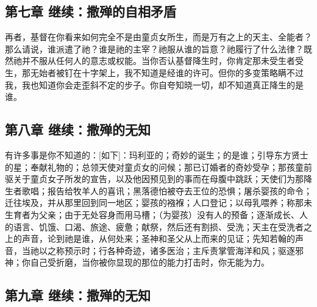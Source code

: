 
\subsection{第七章 继续：撒殚的自相矛盾}

再者，基督在你看来如何完全不是由童贞女所生，而是万有之上的天主、全能者？那么请说，谁派遣了祂？谁是祂的主宰？祂服从谁的旨意？祂履行了什么法律？既然祂并不服从任何人的意志或权能。当你否认基督降生时，你肯定那未受生者受生，那无始者被钉在十字架上，我不知道是经谁的许可。但你的多变策略瞒不过我，我也知道你会走歪斜不定的步子。你自夸知晓一切，却不知道真正降生的是谁。\par


\subsection{第八章 继续：撒殚的无知}

有许多事是你不知道的：[如下]：玛利亚的；奇妙的诞生；的是谁；引导东方贤士的星；奉献礼物的；总领天使对童贞女的问候；那已订婚者的奇妙受孕；那孩童前驱关于童贞女子所发的宣告，以及他因预见到的事而在母腹中跳跃；天使们为那降生者歌唱；报告给牧羊人的喜讯；黑落德怕被夺去王位的恐惧；屠杀婴孩的命令；迁往埃及，并从那里回到同一地区；婴孩的襁褓；人口登记；以母乳喂养；称那未生育者为父亲；由于无处容身而用马槽；（为婴孩）没有人的预备；逐渐成长、人的语言、饥饿、口渴、旅途、疲惫；献祭，然后还有割损、受洗；天主在受洗者之上的声音，论到祂是谁，从何处来；圣神和圣父从上而来的见证；先知若翰的声音，当祂以之称预示时；行各种奇迹，诸多医治；主斥责掌管海洋和风；驱逐邪神；你自己受折磨，当你被你显现的那位的能力打击时，你无能为力。\par


\subsection{第九章 继续：撒殚的无知}

